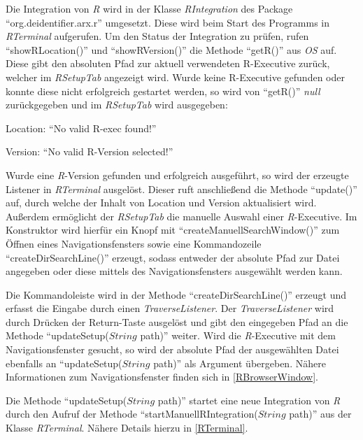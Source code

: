 \documentclass[a4paper, 12pt]{report} %
\begin{document}

Die Integration von \textit{R} wird in der Klasse \textit{RIntegration} des  Package "`org.deidentifier.arx.r"' umgesetzt. Diese wird beim Start des Programms in \textit{RTerminal} aufgerufen. 
 Um den Status der Integration zu prüfen, rufen "`showRLocation()"' und "`showRVersion()"' die Methode "`getR()"' aus \textit{OS} auf. Diese gibt den absoluten Pfad zur aktuell verwendeten R-Executive zurück, welcher im \textit{RSetupTab} angezeigt wird.
Wurde keine R-Executive gefunden oder konnte diese nicht erfolgreich gestartet werden, so wird von "`getR()"' \textit{null} zurückgegeben und im \textit{RSetupTab} wird ausgegeben:  
\begin{center}
Location: "`No valid R-exec found!"'

Version: "`No valid R-Version selected!"'
\end{center}
Wurde eine \textit{R}-Version gefunden und erfolgreich ausgeführt, so wird der erzeugte Listener in \textit{RTerminal} ausgelöst. Dieser ruft anschließend die Methode "`update()"' auf, durch welche der Inhalt von Location und Version aktualisiert wird.\\

Außerdem ermöglicht der \textit{RSetupTab} die manuelle Auswahl einer \textit{R}-Executive. Im Konstruktor wird hierfür ein Knopf mit "`createManuellSearchWindow()"' zum Öffnen eines Navigationsfensters sowie eine Kommandozeile "`createDirSearchLine()"' erzeugt, sodass entweder der absolute Pfad zur Datei angegeben oder diese mittels des Navigationsfensters ausgewählt werden kann.

Die Kommandoleiste wird in der Methode "`createDirSearchLine()"' erzeugt und erfasst die Eingabe durch einen \textit{TraverseListener}. Der \textit{TraverseListener} wird durch Drücken der Return-Taste ausgelöst und gibt den eingegeben Pfad an die Methode "`updateSetup($String$ path)"' weiter. Wird die \textit{R}-Executive mit dem Navigationsfenster gesucht, so wird der absolute Pfad der ausgewählten Datei ebenfalls an "`updateSetup($String$ path)"' als Argument übergeben. Nähere Informationen zum Navigationsfenster finden sich in \ref{RBrowserWindow}.

Die Methode "`updateSetup($String$ path)"' startet eine neue Integration von \textit{R} durch den Aufruf der Methode "`startManuellRIntegration($String$ path)"' aus der Klasse \textit{RTerminal}. Nähere Details hierzu in \ref{RTerminal}. 
\end{document}
